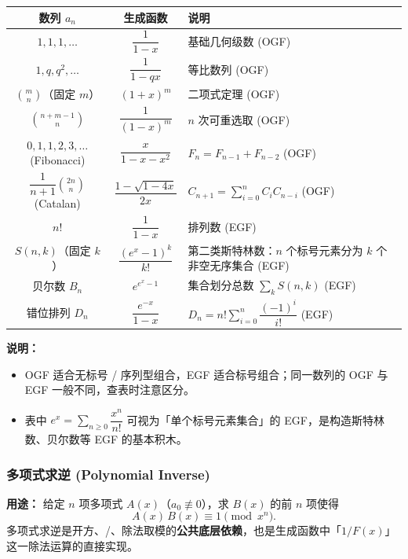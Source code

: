 \begin{center}
\begin{tabularx}{\textwidth}{|c|c|X|}
\hline
\textbf{数列 $a_n$} & \textbf{生成函数} & \textbf{说明} \\ \hline
$1,1,1,\dots$ & $\dfrac{1}{1-x}$ & 基础几何级数 (OGF) \\ \hline
$1,q,q^2,\dots$ & $\dfrac{1}{1-qx}$ & 等比数列 (OGF) \\ \hline
$\binom{m}{n}$（固定 $m$） & $(1+x)^m$ & 二项式定理 (OGF) \\ \hline
$\binom{n+m-1}{n}$ & $\dfrac{1}{(1-x)^m}$ & $n$ 次可重选取 (OGF) \\ \hline
$0,1,1,2,3,\dots$ (Fibonacci) & $\dfrac{x}{1-x-x^2}$ & $F_n=F_{n-1}+F_{n-2}$ (OGF) \\ \hline
$\dfrac{1}{n+1}\binom{2n}{n}$ (Catalan) & $\dfrac{1-\sqrt{1-4x}}{2x}$ & $C_{n+1}=\sum_{i=0}^{n}C_iC_{n-i}$ (OGF) \\ \hline
$n!$ & $\dfrac{1}{1-x}$ & 排列数 (EGF) \\ \hline
$S(n,k)$（固定 $k$） & $\dfrac{(e^x-1)^k}{k!}$ & 第二类斯特林数：$n$ 个标号元素分为 $k$ 个非空无序集合 (EGF) \\ \hline
贝尔数 $B_n$ & $e^{e^x-1}$ & 集合划分总数 $\sum_k S(n,k)$ (EGF) \\ \hline
错位排列 $D_n$ & $\dfrac{e^{-x}}{1-x}$ & $D_n=n!\sum_{i=0}^{n}\dfrac{(-1)^i}{i!}$ (EGF) \\ \hline
\end{tabularx}
\end{center}

\textbf{说明：}
\begin{itemize}
    \item OGF 适合无标号 / 序列型组合，EGF 适合标号组合；同一数列的 OGF 与 EGF 一般不同，查表时注意区分。
    \item 表中 $e^x=\sum_{n\ge 0}\dfrac{x^n}{n!}$ 可视为「单个标号元素集合」的 EGF，是构造斯特林数、贝尔数等 EGF 的基本积木。
\end{itemize}

\subsubsection{多项式求逆 (Polynomial Inverse)}

\textbf{用途：}
给定 $n$ 项多项式 $A(x)$（$a_0\not\equiv 0$），求 $B(x)$ 的前 $n$ 项使得
\[ A(x)\,B(x) \equiv 1 \pmod{x^n}. \]
多项式求逆是开方、/、除法取模的\textbf{公共底层依赖}，也是生成函数中「$1/F(x)$」这一除法运算的直接实现。

